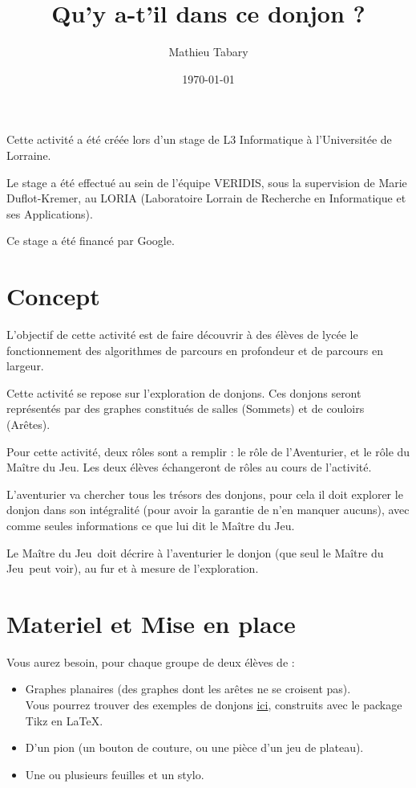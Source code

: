 \documentclass{article}
\title{Qu'y a-t'il dans ce donjon ?}
\author{Mathieu Tabary}
\date{\today}
\newcommand{\mj}{Maître du Jeu}
\begin{document}
\maketitle

Cette activité a été créée lors d'un stage de L3 Informatique à l'Universitée de Lorraine.

Le stage a été effectué au sein de l'équipe VERIDIS, sous la supervision de Marie Duflot-Kremer, au LORIA (Laboratoire Lorrain de Recherche en Informatique et ses Applications).

Ce stage a été financé par Google.

\doclicenseThis

\part{Concept}
    L'objectif de cette activité est de faire découvrir à des élèves de lycée le fonctionnement des algorithmes de parcours en profondeur et de parcours en largeur.

    Cette activité se repose sur l'exploration de donjons. Ces donjons seront représentés par des graphes constitués de salles (Sommets) et de couloirs (Arêtes).


    \bigskip
    Pour cette activité, deux rôles sont a remplir : le rôle de l'Aventurier, et le rôle du \mj. Les deux élèves échangeront de rôles au cours de l'activité.

    L'aventurier va chercher tous les trésors des donjons, pour cela il doit explorer le donjon dans son intégralité (pour avoir la garantie de n'en manquer aucuns), avec comme seules informations ce que lui dit le \mj.

    Le \mj\ doit décrire à l'aventurier le donjon (que seul le \mj\ peut voir), au fur et à mesure de l'exploration.

\part{Materiel et Mise en place}
    Vous aurez besoin, pour chaque groupe de deux élèves de :
    \begin{itemize}
        \item Graphes planaires (des graphes dont les arêtes ne se croisent pas).\\
        Vous pourrez trouver des exemples de donjons \href{https://github.com/TabaryM/Mediation_Graphes/tree/master/Fiches%20d'activit%C3%A9}{ici}, construits avec le package Tikz en \LaTeX{}.
        \item D'un pion (un bouton de couture, ou une pièce d'un jeu de plateau).
        \item Une ou plusieurs feuilles et un stylo.
    \end{itemize}
\end{document}
